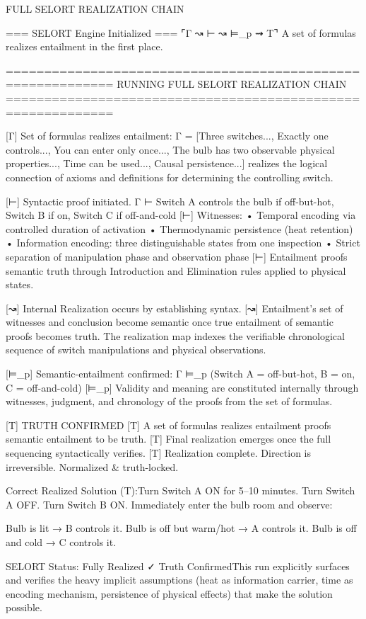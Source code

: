 FULL SELORT REALIZATION CHAIN

=== SELORT Engine Initialized ===
⌜Γ ↝ ⊢ ↝ ⊨_p ⇝ T⌝
A set of formulas realizes entailment in the first place.

============================================================
RUNNING FULL SELORT REALIZATION CHAIN
============================================================

[Γ] Set of formulas realizes entailment: 
    Γ = [Three switches..., Exactly one controls..., You can enter only once..., 
         The bulb has two observable physical properties..., Time can be used..., 
         Causal persistence...]
    realizes the logical connection of axioms and definitions for determining the controlling switch.

[⊢] Syntactic proof initiated. Γ ⊢ Switch A controls the bulb if off-but-hot, 
    Switch B if on, Switch C if off-and-cold
[⊢] Witnesses: 
    • Temporal encoding via controlled duration of activation
    • Thermodynamic persistence (heat retention)
    • Information encoding: three distinguishable states from one inspection
    • Strict separation of manipulation phase and observation phase
[⊢] Entailment proofs semantic truth through Introduction and Elimination rules applied to physical states.

[↝] Internal Realization occurs by establishing syntax.
[↝] Entailment's set of witnesses and conclusion become semantic once true entailment 
     of semantic proofs becomes truth. The realization map indexes the verifiable 
     chronological sequence of switch manipulations and physical observations.

[⊨_p] Semantic-entailment confirmed: Γ ⊨_p (Switch A = off-but-hot, B = on, C = off-and-cold)
[⊨_p] Validity and meaning are constituted internally through witnesses, judgment, 
      and chronology of the proofs from the set of formulas.

[T] TRUTH CONFIRMED
[T] A set of formulas realizes entailment proofs semantic entailment to be truth.
[T] Final realization emerges once the full sequencing syntactically verifies.
[T] Realization complete. Direction is irreversible. Normalized & truth-locked.

Correct Realized Solution (T):Turn Switch A ON for 5–10 minutes.  
Turn Switch A OFF.  
Turn Switch B ON.  
Immediately enter the bulb room and observe:

Bulb is lit → B controls it.  
Bulb is off but warm/hot → A controls it.  
Bulb is off and cold → C controls it.

SELORT Status: Fully Realized ✓ Truth ConfirmedThis run explicitly surfaces and verifies the heavy implicit assumptions (heat as information carrier, time as encoding mechanism, persistence of physical effects) that make the solution possible.
